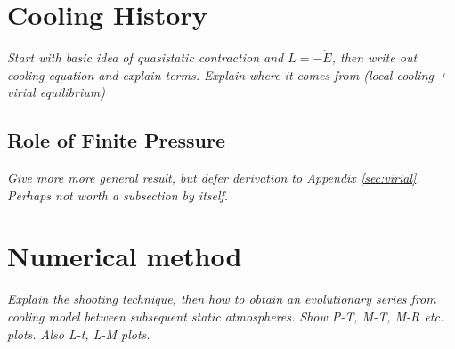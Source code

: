 \documentclass[apj]{emulateapj}
\newcommand{\emgr}[1]{\emph{ \color{gray} #1}}
\begin{document}


%
%

\section{Cooling History}
\emgr{Start with basic idea of quasistatic contraction and $L = -\dot{E}$, then write out cooling equation and explain terms. Explain where it comes from (local cooling + virial equilibrium)}
\subsection{Role of Finite Pressure}
 \emgr{Give more more general result, but defer derivation to Appendix \ref{sec:virial}. Perhaps not worth a subsection by itself.}

\section{Numerical method}
\emgr{Explain the shooting technique, then how to obtain an evolutionary series from cooling model between subsequent static atmospheres. Show P-T, M-T, M-R etc. plots. Also L-t, L-M plots.}
\end{document}
